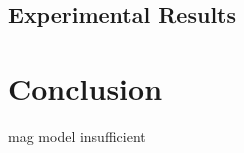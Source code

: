 \documentclass[conference]{IEEEtran}
\begin{document}
\subsection{Experimental Results}



\section{Conclusion}
mag model insufficient %







\newpage
{}






\end{document}
